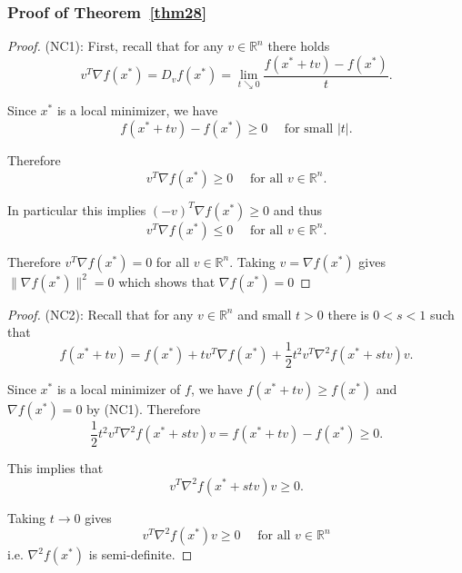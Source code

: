 \subsubsection{Proof of Theorem~\ref{thm28}}
\label{appendix:thm28}
\begin{proof}
(NC1): First, recall that for any $v \in \mathbb{R}^n$ there holds
$$
v^{T} \nabla f\left(x^{*}\right)=D_{v} f\left(x^{*}\right)=\lim _{t \searrow 0} \frac{f\left(x^{*}+t v\right)-f\left(x^{*}\right)}{t}.
$$
\par Since $x^*$ is a local minimizer, we have
$$
f\left(x^{*}+t v\right)-f\left(x^{*}\right) \geq 0 \quad \textrm { for small }|t|.
$$
\par Therefore
$$
v^{T} \nabla f\left(x^{*}\right) \geq 0 \quad \textrm { for all } v \in \mathbb{R}^{n}.
$$
\par In particular this implies $(-v)^{T} \nabla f\left(x^{*}\right) \geq 0$ and thus 
$$
v^{T} \nabla f\left(x^{*}\right) \leq 0 \quad \textrm { for all } v \in \mathbb{R}^{n}.
$$
\par Therefore $v^{T} \nabla f(x^{*})=0$ for all $v \in \mathbb{R}^{n}$. Taking $v=\nabla f(x^*)$ gives $\|\nabla f(x^*)\|^2 = 0$ which shows that $\nabla f(x^{*})=0$ 
\end{proof}
\begin{proof}
(NC2): Recall that for any $v \in \mathbb{R}^n$ and small $t > 0$ there is $0 < s < 1$ such that 
$$
f\left(x^{*}+t v\right)=f\left(x^{*}\right)+t v^{T} \nabla f\left(x^{*}\right)+\frac{1}{2} t^{2} v^{T} \nabla^{2} f\left(x^{*}+s t v\right) v.
$$
\par Since $x^*$ is a local minimizer of $f$, we have $f\left(x^{*}+t v\right) \geq f\left(x^{*}\right)$ and $\nabla f(x^{*})=0$ by (NC1). Therefore
$$
\frac{1}{2} t^{2} v^{T} \nabla^{2} f\left(x^{*}+s t v\right) v=f\left(x^{*}+t v\right)-f\left(x^{*}\right) \geq 0 .
$$
\par This implies that
$$
v^{T} \nabla^{2} f\left(x^{*}+s t v\right) v \geq 0.
$$
\par Taking $t \rightarrow 0$ gives
$$
v^{T} \nabla^{2} f\left(x^{*}\right) v \geq 0 \quad \textrm { for all } v \in \mathbb{R}^{n}
$$ 
i.e. $\nabla^2 f(x^*)$ is semi-definite.
\end{proof}
